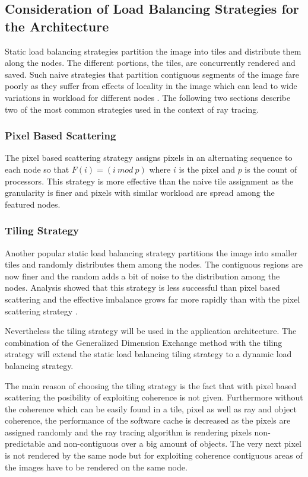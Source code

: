\documentclass[DIV10, abstracton, openright, footsepline, headsepline, twoside, 9pt,
bigheadings]{scrreprt}
\begin{document}
\subsection{Consideration of Load Balancing Strategies for the Architecture}

Static load balancing strategies partition the image into tiles and distribute them
along the nodes. The different portions, the tiles,  are concurrently rendered and
saved. Such naive strategies that partition contiguous segments of the image fare
poorly  as they suffer from effects of locality in the image which
can lead to wide variations in workload for different nodes \cite{Heirich198}. The
following two sections describe two of the most common strategies used in the context
of ray tracing.

\subsubsection{Pixel Based Scattering}
The pixel based scattering strategy assigns pixels in an alternating sequence
to each node so that $F(i) = (i\ mod\ p)$ where $i$ is the pixel and $p$ is the count
of processors. This strategy is more effective than the naive tile assignment as the
granularity is finer and pixels with similar workload are spread among the
featured nodes.

\subsubsection{Tiling Strategy}
Another  popular static load balancing strategy partitions the image into smaller tiles
 and  randomly distributes them among the nodes. The contiguous regions are now finer
and the random adds a bit of noise to the distribution among the nodes. Analysis showed
that this strategy is less successful than pixel based scattering and the effective
imbalance grows far more rapidly than with the pixel scattering strategy
\cite{Heirich198}.


Nevertheless the tiling strategy will be used in the application architecture. The
combination of the Generalized Dimension Exchange method with the tiling strategy
will extend the static load balancing tiling strategy to a dynamic load balancing
strategy.

The main reason of choosing the tiling strategy is the fact that with pixel based
scattering the posibility of exploiting coherence is not given. Furthermore without
 the coherence which can be easily found in a tile, pixel as well as ray and object
coherence, the performance of the software  cache is decreased as the
pixels are assigned randomly and the ray tracing algorithm is rendering pixels
non-predictable and non-contiguous over a big amount of objects. The very next pixel
is not rendered by the same node but for exploiting coherence
contiguous areas of the images have to be rendered on the same node.
\end{document}
